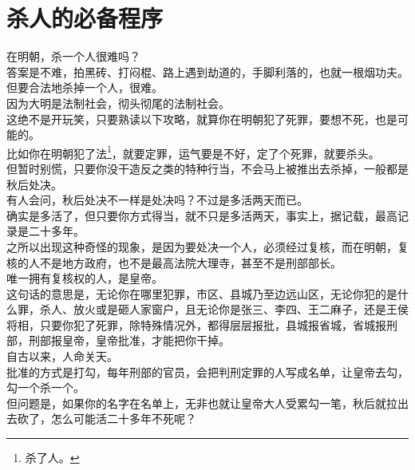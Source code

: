 \section{杀人的必备程序}
\ifnum{}
	\begin{multicols}{\theparacolNo}
\fi
在明朝，杀一个人很难吗？\\

答案是不难，拍黑砖、打闷棍、路上遇到劫道的，手脚利落的，也就一根烟功夫。\\

但要合法地杀掉一个人，很难。\\

因为大明是法制社会，彻头彻尾的法制社会。\\

这绝不是开玩笑，只要熟读以下攻略，就算你在明朝犯了死罪，要想不死，也是可能的。\\

比如你在明朝犯了法\footnote{杀了人。}，就要定罪，运气要是不好，定了个死罪，就要杀头。\\

但暂时别慌，只要你没干造反之类的特种行当，不会马上被推出去杀掉，一般都是秋后处决。\\

有人会问，秋后处决不一样是处决吗？不过是多活两天而已。\\

确实是多活了，但只要你方式得当，就不只是多活两天，事实上，据记载，最高记录是二十多年。\\

之所以出现这种奇怪的现象，是因为要处决一个人，必须经过复核，而在明朝，复核的人不是地方政府，也不是最高法院大理寺，甚至不是刑部部长。\\

唯一拥有复核权的人，是皇帝。\\

这句话的意思是，无论你在哪里犯罪，市区、县城乃至边远山区，无论你犯的是什么罪，杀人、放火或是砸人家窗户，且无论你是张三、李四、王二麻子，还是王侯将相，只要你犯了死罪，除特殊情况外，都得层层报批，县城报省城，省城报刑部，刑部报皇帝，皇帝批准，才能把你干掉。\\

自古以来，人命关天。\\

批准的方式是打勾，每年刑部的官员，会把判刑定罪的人写成名单，让皇帝去勾，勾一个杀一个。\\

但问题是，如果你的名字在名单上，无非也就让皇帝大人受累勾一笔，秋后就拉出去砍了，怎么可能活二十多年不死呢？\\


\end{multicols}
